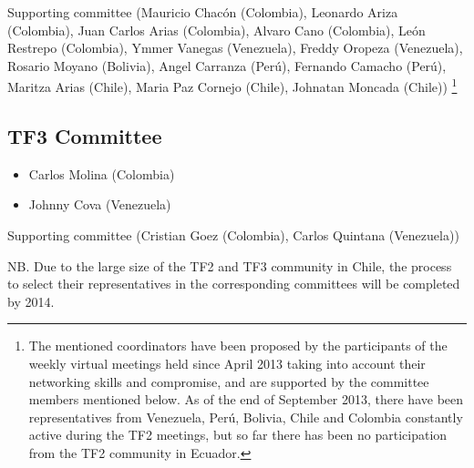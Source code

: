 \documentclass[12pt]{article}
\begin{document}
Supporting committee (Mauricio Chacón (Colombia), Leonardo Ariza
(Colombia), Juan Carlos Arias (Colombia), Alvaro Cano (Colombia), León
Restrepo (Colombia), Ymmer Vanegas (Venezuela), Freddy Oropeza
(Venezuela), Rosario Moyano (Bolivia), Angel Carranza (Perú), Fernando
Camacho (Perú), Maritza Arias (Chile), Maria Paz Cornejo (Chile),
Johnatan Moncada (Chile)) \footnote{The mentioned coordinators have
  been proposed by the participants of the weekly virtual meetings
  held since April 2013 taking into account their networking skills
  and compromise, and are supported by the committee members mentioned
  below. As of the end of September 2013, there have been
  representatives from Venezuela, Perú, Bolivia, Chile and Colombia
  constantly active during the TF2 meetings, but so far there has been
  no participation from the TF2 community in Ecuador. } 



\subsection*{TF3 Committee}
\begin{itemize}
\item Carlos Molina (Colombia)
\item Johnny Cova (Venezuela)
\end{itemize}

Supporting committee (Cristian Goez (Colombia), Carlos Quintana (Venezuela))

NB. Due to the large size of the TF2 and TF3 community in Chile, the
process to select their representatives in the corresponding
committees will be completed by 2014. 
 
\end{document}

